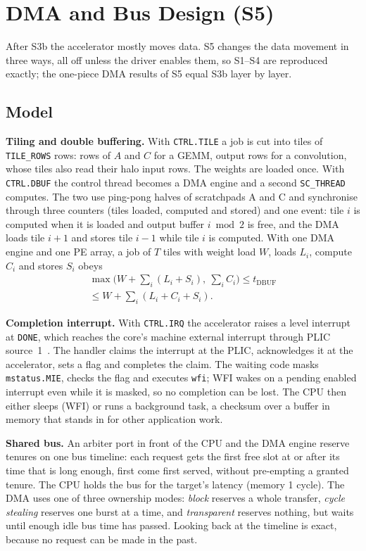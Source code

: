 \documentclass[conference]{IEEEtran}
\begin{document}
\section{DMA and Bus Design (S5)}
After S3b the accelerator mostly moves data. S5 changes the data movement in three ways, all off unless the driver enables them, so S1--S4 are reproduced exactly; the one-piece DMA results of S5 equal S3b layer by layer.

\subsection{Model}
\textbf{Tiling and double buffering.} With \texttt{CTRL.TILE} a job is cut into tiles of \texttt{TILE\_ROWS} rows: rows of $A$ and $C$ for a GEMM, output rows for a convolution, whose tiles also read their halo input rows. The weights are loaded once. With \texttt{CTRL.DBUF} the control thread becomes a DMA engine and a second \texttt{SC\_THREAD} computes. The two use ping-pong halves of scratchpads A and C and synchronise through three counters (tiles loaded, computed and stored) and one event: tile $i$ is computed when it is loaded and output buffer $i \bmod 2$ is free, and the DMA loads tile $i{+}1$ and stores tile $i{-}1$ while tile $i$ is computed. With one DMA engine and one PE array, a job of $T$ tiles with weight load $W$, loads $L_i$, compute $C_i$ and stores $S_i$ obeys
\begin{multline}
\max\Big(W + \textstyle\sum_i (L_i + S_i),\ \sum_i C_i\Big) \le t_{\mathrm{DBUF}} \\
\le W + \textstyle\sum_i (L_i + C_i + S_i).
\label{eq:dbuf}
\end{multline}

\textbf{Completion interrupt.} With \texttt{CTRL.IRQ} the accelerator raises a level interrupt at \texttt{DONE}, which reaches the core's machine external interrupt through PLIC source~1~\cite{fe310,riscv_priv}. The handler claims the interrupt at the PLIC, acknowledges it at the accelerator, sets a flag and completes the claim. The waiting code masks \texttt{mstatus.MIE}, checks the flag and executes \texttt{wfi}; WFI wakes on a pending enabled interrupt even while it is masked, so no completion can be lost. The CPU then either sleeps (WFI) or runs a background task, a checksum over a buffer in memory that stands in for other application work.

\textbf{Shared bus.} An arbiter port in front of the CPU and the DMA engine reserve tenures on one bus timeline: each request gets the first free slot at or after its time that is long enough, first come first served, without pre-empting a granted tenure. The CPU holds the bus for the target's latency (memory 1 cycle). The DMA uses one of three ownership modes: \emph{block} reserves a whole transfer, \emph{cycle stealing} reserves one burst at a time, and \emph{transparent} reserves nothing, but waits until enough idle bus time has passed. Looking back at the timeline is exact, because no request can be made in the past.
\end{document}
